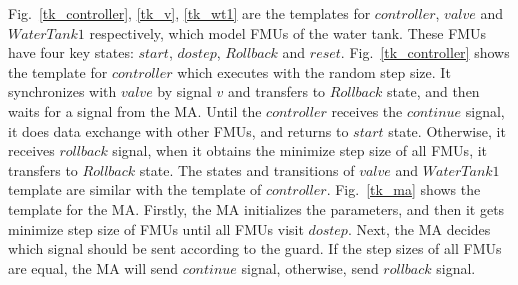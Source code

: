 \begin{figure}[htbp]
\end{figure}

Fig.~\ref{tk_controller}, \ref{tk_v}, \ref{tk_wt1} are the templates for $controller$, $valve$ and $WaterTank1$ respectively, which model FMUs of the water tank. These FMUs have four key states: $start$, $dostep$, $Rollback$ and $reset$. Fig.~\ref{tk_controller} shows the template for $controller$ which executes with the random step size. It synchronizes with $valve$ by signal $v$ and transfers to $Rollback$ state, and then waits for a signal from the MA. Until the $controller$ receives the $continue$ signal, it does data exchange with other FMUs, and returns to $start$ state. Otherwise, it receives $rollback$ signal, when it obtains the minimize step size of all FMUs, it transfers to $Rollback$ state. The states and transitions of $valve$ and $WaterTank1$ template are similar with the template of $controller$. Fig.~\ref{tk_ma} shows the template for the MA. Firstly, the MA initializes the parameters, and then it gets minimize step size of FMUs until all FMUs visit $dostep$. Next, the MA decides which signal should be sent according to the guard. If the step sizes of all FMUs are equal, the MA will send $continue$ signal, otherwise, send $rollback$ signal.

